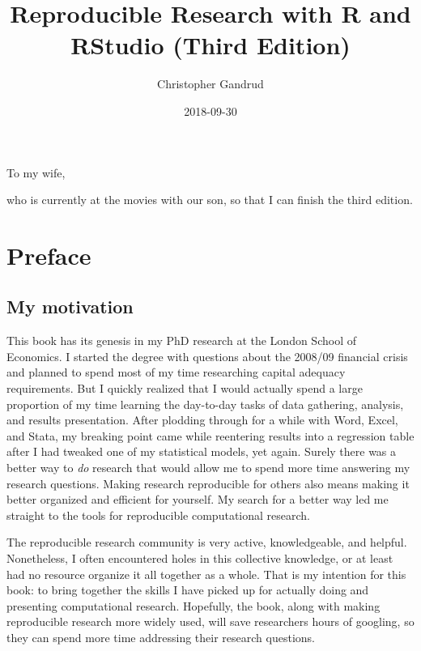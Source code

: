 \documentclass[]{krantz}
\title{Reproducible Research with R and RStudio (Third Edition)}
\author{Christopher Gandrud}
\date{2018-09-30}
\theoremstyle{definition}
\theoremstyle{definition}
\theoremstyle{definition}
\theoremstyle{remark}
\begin{document}
\maketitle


\thispagestyle{empty}

\begin{center}
To my wife,

who is currently at the movies with our son, so that I can finish the third edition.
\end{center}

\setlength{\abovedisplayskip}{-5pt}
\setlength{\abovedisplayshortskip}{-5pt}

{
\hypersetup{linkcolor=}
\setcounter{tocdepth}{2}
\tableofcontents
}
\listoftables
\listoffigures
\hypertarget{preface}{%
\chapter*{Preface}\label{preface}}


\hypertarget{my-motivation}{%
\section*{My motivation}\label{my-motivation}}


This book has its genesis in my PhD research at the London School of
Economics. I started the degree with questions about the 2008/09
financial crisis and planned to spend most of my time researching
capital adequacy requirements. But I quickly realized that I would
actually spend a large proportion of my time learning the day-to-day
tasks of data gathering, analysis, and results presentation. After
plodding through for a while with Word, Excel, and Stata, my breaking
point came while reentering results into a regression table after I had
tweaked one of my statistical models, yet again. Surely there was a
better way to \emph{do} research that would allow me to spend more time
answering my research questions. Making research reproducible for others
also means making it better organized and efficient for yourself. My
search for a better way led me straight to the tools for reproducible
computational research.

The reproducible research community is very active, knowledgeable, and
helpful. Nonetheless, I often encountered holes in this collective
knowledge, or at least had no resource organize it all together as a
whole. That is my intention for this book: to bring together the skills
I have picked up for actually doing and presenting computational
research. Hopefully, the book, along with making reproducible research
more widely used, will save researchers hours of googling, so they can
spend more time addressing their research questions.
\end{document}
